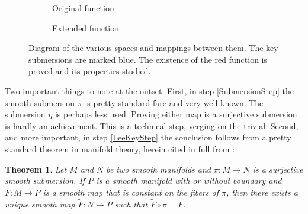 \documentclass[a4paper,11pt]{scrartcl}
\newcounter{dummy}
\numberwithin{dummy}{section}
\theoremstyle{plain}
\theoremstyle{plain}
\theoremstyle{plain}
\theoremstyle{plain}
\newtheorem{theorem}[dummy]{Theorem}
\theoremstyle{nonumberplain}
\newcommand{\F}[1][R]{\mathbb{#1}} %
\newcommand{\SO}{\mathrm{SO}}
\begin{document}
	\begin{figure}
		\begin{center}
			\begin{subfigure}{0.4\textwidth}
				\caption{Original function}
				\label{ProofDiagramA}
			\end{subfigure}
			\begin{subfigure}{0.4\textwidth}
				\caption{Extended function}
				\label{ProofDiagramB}
			\end{subfigure}
			\caption{Diagram of the various spaces and mappings between them. The key submersions are marked blue. The existence of the red function is proved and its properties studied.}
			\label{ProofDiagram}
		\end{center}
	\end{figure}
	
	Two important things to note at the outset. First, in step \ref{SubmersionStep} the smooth submersion $ \pi $ is pretty standard fare and very well-known. The submersion $ \eta $ is perhaps less used. Proving either map is a surjective submersion is hardly an achievement. This is a technical step, verging on the trivial. Second, and more important, in step \ref{LeeKeyStep} the conclusion follows from a pretty standard theorem in manifold theory, herein cited in full from \textcite[90]{Lee2013}:
	\begin{theorem}
		\label{PassingThroughSubmersion}
		Let $ M $ and $ N $ be two smooth manifolds and $ \pi : M \to N $ is a surjective smooth submersion. If $ P $ is a smooth manifold with or without boundary and $ F : M \to P $ is a smooth map that is constant on the fibers of $ \pi $, then there exists a unique smooth map $ \widetilde{F} : N \to P $ such that $ \widetilde{F} \circ \pi = F $.
	\end{theorem}
	
\end{document}

